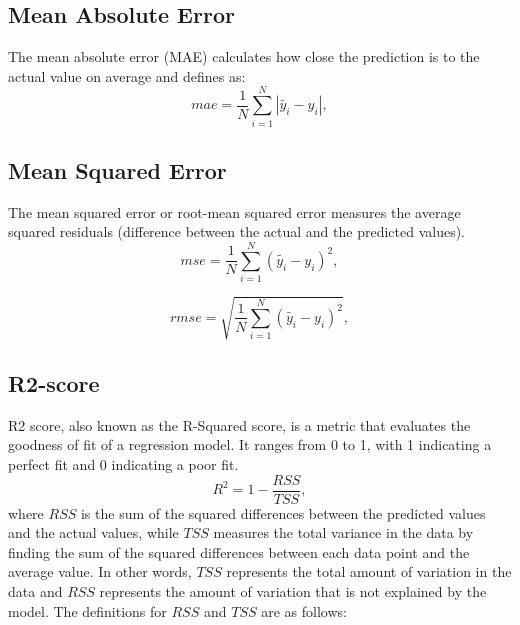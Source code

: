 {\subsection{Mean Absolute Error}

The mean absolute error (MAE) calculates how close the prediction is to the actual value on average and defines as:
\begin{equation}\label{mse}
  mae = \frac{1}{N} \sum_{i=1}^N |\tilde{y_i} - y_i|,
\end{equation}


\subsection{Mean Squared Error}
The mean squared error or root-mean squared error measures the average squared residuals (difference between the actual and the predicted values).
\begin{equation}\label{mse}
  mse = \frac{1}{N} \sum_{i=1}^N (\tilde{y_i} - y_i)^2,
\end{equation}

\begin{equation}\label{rmse}
  rmse = \sqrt{\frac{1}{N} \sum_{i=1}^N (\tilde{y_i} - y_i)^2},
\end{equation}


\newpage
\subsection{R2-score}
R2 score, also known as the R-Squared score, is a metric that evaluates the goodness of fit of a regression model. It ranges from 0 to 1, with 1 indicating a perfect fit and 0 indicating a poor fit.
\begin{equation}\label{rmse}
  R^2 = 1- \frac{RSS}{TSS},
\end{equation} where $RSS$  is the sum of the squared differences between the predicted values and the actual values, while $TSS$ measures the total variance in the data by finding the sum of the squared differences between each data point and the average value. In other words, $TSS$ represents the total amount of variation in the data and $RSS$ represents the amount of variation that is not explained by the model. The definitions for $RSS$ and $TSS$ are as follows:

}
